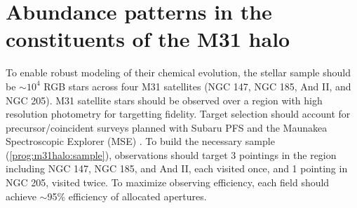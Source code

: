 \documentclass[11pt,a4paper,twoside,onecolumn,openany,final,oldfontcommands]{memoir}
\def\NS#1{\noindent{\textcolor{lblue}{\textbf[NS: #1]}}}
\begin{document}




\section{Abundance patterns in the constituents of the M31 halo}


\begin{programrequirement}
\reqitem To enable robust modeling of their chemical evolution, the stellar sample should be $\sim10^{4}$ RGB stars across four M31 satellites (NGC 147, NGC 185, And II, and NGC 205). \NS{Why these four specifically?}  \label{prog:m31halo:sample}
\reqitem M31 satellite stars should be observed over a region with high resolution photometry for targetting fidelity.
\reqitem Target selection should account for precursor/coincident surveys planned with Subaru PFS and the Maunakea Spectroscopic Explorer (MSE) \NS{If any? Need to check what their plans are for M31 satellites}.
\reqitem To build the necessary sample (\ref{prog:m31halo:sample}), observations should target 3 pointings in the region including NGC 147, NGC 185, and And II, each visited once, and 1 pointing in NGC 205, visited twice.
\reqitem To maximize observing efficiency, each field should achieve $\sim$95\% efficiency of allocated apertures. \NS{Is this reasonable in these fields?}
\end{programrequirement}
\end{document}
